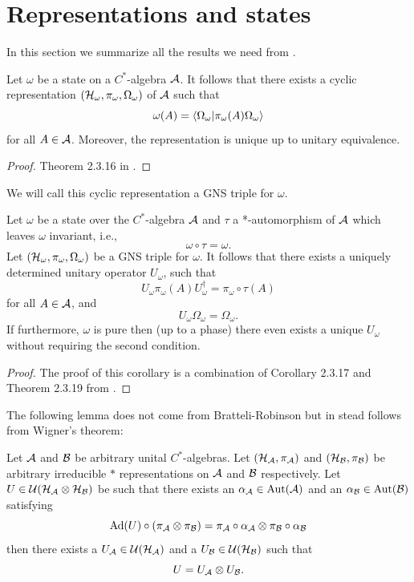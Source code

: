 \documentclass[12pt,a4paper,twoside]{article}
\numberwithin{equation}{section}
\begin{document}
\section{Representations and states}
In this section we summarize all the results we need from \cite{bratteli1979operator}.
\begin{theorem}\label{thrm:ExistenceGNS}
	Let $\omega$ be a state on a $C^*$-algebra $\AA$. It follows that there exists a cyclic representation $(\HH_\omega,\pi_\omega,\Omega_\omega)$ of $\AA$ such that
	\[\omega(A)=\bra{\Omega_\omega}\ket{\pi_\omega(A)\Omega_\omega}\]
	for all $A\in\AA$. Moreover, the representation is unique up to unitary equivalence.
\end{theorem}
\begin{proof}
	Theorem 2.3.16 in \cite{bratteli1979operator}.
\end{proof}
We will call this cyclic representation a GNS triple for $\omega$.
\begin{corollary}\label{cor:ExistenceOfUnitary}
	Let $\omega$ be a state over the $C^*$-algebra $\AA$ and $\tau$ a *-automorphism of $\AA$ which leaves $\omega$ invariant, i.e.,
	\[\omega\circ\tau=\omega.\]
	Let $(\HH_\omega,\pi_\omega,\Omega_\omega)$ be a GNS triple for $\omega$. It follows that there exists a uniquely determined unitary operator $U_\omega$, such that
	\[U_\omega \pi_\omega(A)U_\omega^\dagger=\pi_\omega\circ\tau(A) \]
	for all $A\in\AA$, and
	\[U_\omega\Omega_\omega=\Omega_\omega. \]
	If furthermore, $\omega$ is pure then (up to a phase) there even exists a unique $U_\omega$ without requiring the second condition.
\end{corollary}
\begin{proof}
	The proof of this corollary is a combination of Corollary 2.3.17 and Theorem 2.3.19 from \cite{bratteli1979operator}.
\end{proof}
The following lemma does not come from Bratteli-Robinson but in stead follows from Wigner's theorem:
\begin{lemma}\label{lem:SplittingOfUnitary}
	Let $\AA$ and $\BB$ be arbitrary unital $C^*$-algebras. Let $(\HH_\AA,\pi_\AA)$ and $(\HH_\BB,\pi_\BB)$ be arbitrary irreducible $*$ representations on $\AA$ and $\BB$ respectively. Let $U\in\UU(\HH_\AA\otimes\HH_\BB)$ be such that there exists an $\alpha_\AA\in\Aut{\AA}$ and an $\alpha_\BB\in\Aut{\BB}$ satisfying
	\begin{equation}
		\Ad{U}\circ(\pi_\AA\otimes\pi_\BB)=\pi_\AA\circ\alpha_\AA\otimes\pi_\BB\circ\alpha_\BB
	\end{equation}
	then there exists a $U_\AA\in\UU(\HH_\AA)$ and a $U_\BB\in\UU(\HH_\BB)$ such that
	\begin{equation}
		U=U_\AA\otimes U_\BB.
	\end{equation}
\end{lemma}
\end{document}
